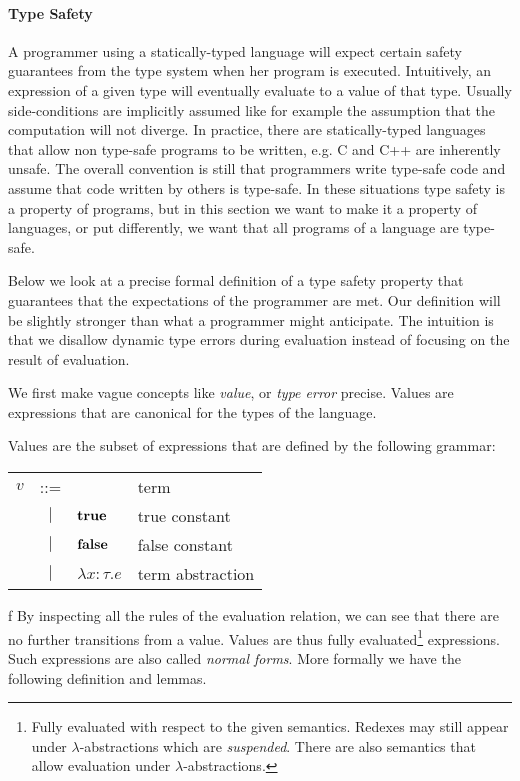 {\paragraph{Type Safety}

A programmer using a statically-typed language will expect certain safety
guarantees from the type system when her program is executed. Intuitively, an
expression of a given type will eventually evaluate to a value of that
type. Usually side-conditions are implicitly assumed like for example the
assumption that the computation will not diverge. In practice, there are
statically-typed languages that allow non type-safe programs to be written,
e.g. C and C++ are inherently unsafe. The overall convention is still that
programmers write type-safe code and assume that code written by others is
type-safe. In these situations type safety is a property of programs, but in
this section we want to make it a property of languages, or put differently, we
want that all programs of a language are type-safe.

Below we look at a precise formal definition of a type safety property that
guarantees that the expectations of the programmer are met. Our definition will
be slightly stronger than what a programmer might anticipate. The intuition is
that we disallow dynamic type errors during evaluation instead of focusing on
the result of evaluation.

We first make vague concepts like \emph{value}, or \emph{type error} precise.
Values are expressions that are canonical for the types of the language.

\begin{defn}[Value]
  Values are the subset of expressions that are defined by the following
  grammar:
  \begin{center}
    \begin{tabular}{lcll}
      $v$ & ::=    &                    & term             \\
          & $\mid$ & $\textbf{true}$            & true constant    \\
          & $\mid$ & $\textbf{false}$           & false constant   \\
          & $\mid$ & $\lambda x:\tau.e$ & term abstraction \\
    \end{tabular}
  \end{center}
\end{defn}
f
By inspecting all the rules of the evaluation relation, we can see that there
are no further transitions from a value. Values are thus fully
evaluated\footnote{Fully evaluated with respect to the given semantics. Redexes
  may still appear under $\lambda$-abstractions which are
  \emph{suspended}. There are also semantics that allow evaluation under
  $\lambda$-abstractions.} expressions. Such expressions are also called
\emph{normal forms}. More formally we have the following definition and lemmas.

}
